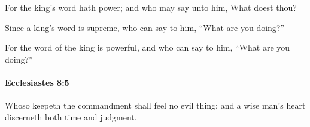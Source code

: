 			\begin{versebox}
					\item[BHS] 
					\item[LXX] 
					\item[ASV] For the king's word hath power; and who may say unto him, What doest thou?
					\item[NIV] Since a king’s word is supreme, who can say to him, “What are you doing?”
					\item[NRSV] For the word of the king is powerful, and who can say to him, “What are you doing?”
			\end{versebox}

		\paragraph{Ecclesiastes 8:5} %
			\label{ECCLESIASTES-8-5}

			Whoso keepeth the commandment shall feel no evil thing: and a wise man’s heart discerneth both time and judgment.

